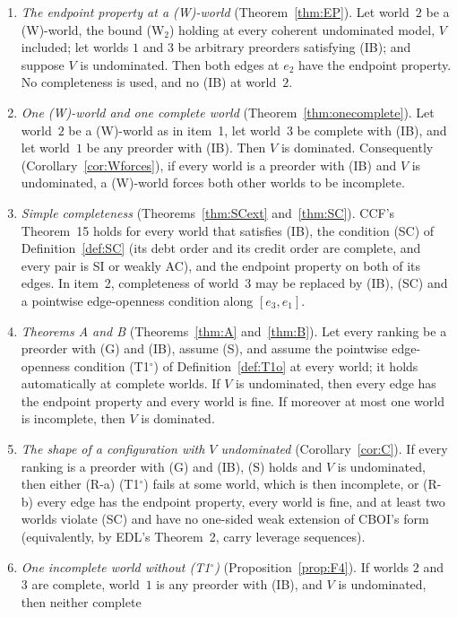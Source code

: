 \documentclass[11pt]{article}
\theoremstyle{definition}\newtheorem{definition}[theorem]{Definition}
\theoremstyle{remark}\newtheorem{remark}[theorem]{Remark}
\newcommand{\To}{\textup{(T1$^\circ$)}}
\begin{document}
\begin{enumerate}[leftmargin=*,itemsep=3pt]
\item \emph{The endpoint property at a (W)-world}
(Theorem~\ref{thm:EP}). Let world~$2$ be a (W)-world, the bound (W$_2$)
holding at every coherent undominated model, $V$ included; let worlds $1$
and $3$ be arbitrary preorders satisfying (IB); and suppose $V$ is
undominated. Then both edges at $e_2$ have the endpoint property. No
completeness is used, and no (IB) at world~$2$.
\item \emph{One (W)-world and one complete world}
(Theorem~\ref{thm:onecomplete}). Let world~$2$ be a (W)-world as in item~1,
let world~$3$ be complete with (IB), and let world~$1$ be any preorder with
(IB). Then $V$ is dominated. Consequently
(Corollary~\ref{cor:Wforces}), if every world is a preorder with (IB) and
$V$ is undominated, a (W)-world forces both other worlds to be incomplete.
\item \emph{Simple completeness} (Theorems~\ref{thm:SCext}
and~\ref{thm:SC}). CCF's Theorem~15 holds for every world that satisfies
(IB), the condition (SC) of Definition~\ref{def:SC} (its debt order and its
credit order are complete, and every pair is SI or weakly AC), and the
endpoint property on both of its edges. In item~2, completeness of world~$3$
may be replaced by (IB), (SC) and a pointwise edge-openness condition along
$[e_3,e_1]$.
\item \emph{Theorems A and B} (Theorems~\ref{thm:A} and~\ref{thm:B}). Let
every ranking be a preorder with (G) and (IB), assume (S), and assume the
pointwise edge-openness condition \To{} of Definition~\ref{def:T1o} at every
world; it holds automatically at complete worlds. If $V$ is undominated,
then every edge has the endpoint property and every world is fine. If
moreover at most one world is incomplete, then $V$ is dominated.
\item \emph{The shape of a configuration with $V$ undominated}
(Corollary~\ref{cor:C}). If every ranking is a preorder with (G) and (IB),
(S) holds and $V$ is undominated, then either (R-a) \To{} fails at some
world, which is then incomplete, or (R-b) every edge has the endpoint
property, every world is fine, and at least two worlds violate (SC) and
have no one-sided weak extension of CBOI's form (equivalently, by EDL's
Theorem~2, carry leverage sequences).
\item \emph{One incomplete world without \To}
(Proposition~\ref{prop:F4}). If worlds $2$ and $3$ are complete, world~$1$
is any preorder with (IB), and $V$ is undominated, then neither complete

\end{enumerate}
\end{document}
